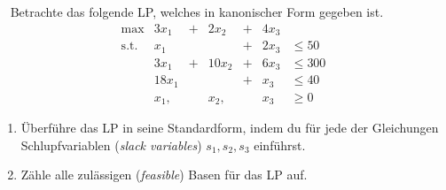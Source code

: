 \documentclass{uebung_cs}
\begin{document}
\begin{exercise}[Standardform][\href{https://moodle.studiumdigitale.uni-frankfurt.de/moodle/mod/assign/view.php?id=245947}{Moodle}\athome]\
	Betrachte das folgende \acs{LP}, welches in kanonischer Form gegeben ist.
	\[
		\begin{array}{rrrllll}
			\text{max}    & 3x_1 		    & + & 2 x_2	& +  & 4x_3  &\\
			\text{s.t.}	&  x_1		    & 	&		& +	 & 2x_3  & \le 50 \\
								& 3x_1 		    & + & 10x_2	& +	 & 6x_3	 & \le 300\\
								& 18 x_1 	    &   &       & +  & x_3 	 & \le 40\\ 
								& x_1,      	&	& x_2,	&	 & x_3	 &\geq 0 
		\end{array}
	\]
	\begin{enumerate}
		\item\easy Überführe das \acs{LP} in seine Standardform, indem du für jede der Gleichungen Schlupfvariablen (\textit{slack variables}) $s_1,s_2,s_3$ einführst.
		\item\medium Zähle alle zulässigen (\emph{feasible}) Basen für das \acs{LP} auf.
	\end{enumerate}
\end{exercise}
\end{document}
